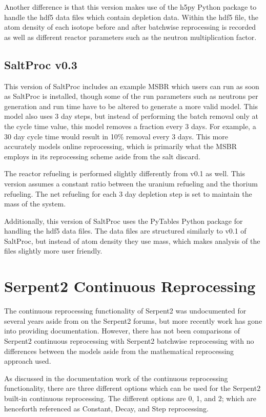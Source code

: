 Another difference is that this version makes use of the h5py Python package to handle the hdf5 data files which contain depletion data. Within the hdf5 file, the atom density of each isotope before and after batchwise reprocessing is recorded as well as different reactor parameters such as the neutron multiplication factor.


\subsection{SaltProc v0.3}

This version of SaltProc includes an example MSBR which users can run as soon as SaltProc is installed, though some of the run parameters such as neutrons per generation and run time have to be altered to generate a more valid model. This model also uses 3 day steps, but instead of performing the batch removal only at the cycle time value, this model removes a fraction every 3 days. For example, a 30 day cycle time would result in 10\% removal every 3 days. This more accurately models online reprocessing, which is primarily what the MSBR employs in its reprocessing scheme aside from the salt discard.

The reactor refueling is performed slightly differently from v0.1 as well. This version assumes a constant ratio between the uranium refueling and the thorium refueling. The net refueling for each 3 day depletion step is set to maintain the mass of the system.

Additionally, this version of SaltProc uses the PyTables Python package for handling the hdf5 data files. The data files are structured similarly to v0.1 of SaltProc, but instead of atom density they use mass, which makes analysis of the files slightly more user friendly.

\section{Serpent2 Continuous Reprocessing}

The continuous reprocessing functionality of Serpent2 was undocumented for several years aside from on the Serpent2 forums, but more recently work has gone into providing documentation. However, there has not been comparisons of Serpent2 continuous reprocessing with Serpent2 batchwise reprocessing with no differences between the models aside from the mathematical reprocessing approach used.

As discussed in the documentation work of the continuous reprocessing functionality, there are three different options which can be used for the Serpent2 built-in continuous reprocessing. The different options are 0, 1, and 2; which are henceforth referenced as Constant, Decay, and Step reprocessing.

